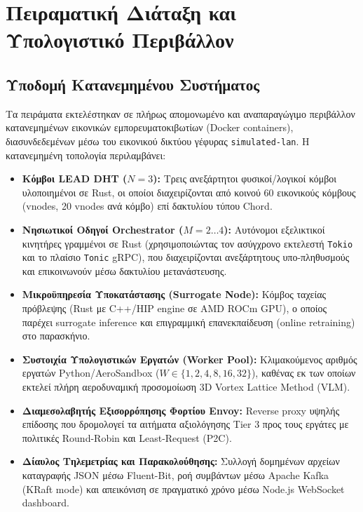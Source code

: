 \section{Πειραματική Διάταξη και Υπολογιστικό Περιβάλλον}
\label{sec:eval_setup}

\subsection{Υποδομή Κατανεμημένου Συστήματος}
Τα πειράματα εκτελέστηκαν σε πλήρως απομονωμένο και αναπαραγώγιμο περιβάλλον κατανεμημένων εικονικών εμπορευματοκιβωτίων (Docker containers), διασυνδεδεμένων μέσω του εικονικού δικτύου γέφυρας \texttt{simulated-lan}. Η κατανεμημένη τοπολογία περιλαμβάνει:
\begin{itemize}
    \item \textbf{Κόμβοι LEAD DHT ($N=3$):} Τρεις ανεξάρτητοι φυσικοί/λογικοί κόμβοι υλοποιημένοι σε Rust, οι οποίοι διαχειρίζονται από κοινού 60 εικονικούς κόμβους (vnodes, 20 vnodes ανά κόμβο) επί δακτυλίου τύπου Chord.
    \item \textbf{Νησιωτικοί Οδηγοί Orchestrator ($M=2\dots 4$):} Αυτόνομοι εξελικτικοί κινητήρες γραμμένοι σε Rust (χρησιμοποιώντας τον ασύγχρονο εκτελεστή \texttt{Tokio} και το πλαίσιο \texttt{Tonic} gRPC), που διαχειρίζονται ανεξάρτητους υπο-πληθυσμούς και επικοινωνούν μέσω δακτυλίου μετανάστευσης.
    \item \textbf{Μικροϋπηρεσία Υποκατάστασης (Surrogate Node):} Κόμβος ταχείας πρόβλεψης (Rust με C++/HIP engine σε AMD ROCm GPU), ο οποίος παρέχει surrogate inference και επιγραμμική επανεκπαίδευση (online retraining) στο παρασκήνιο.
    \item \textbf{Συστοιχία Υπολογιστικών Εργατών (Worker Pool):} Κλιμακούμενος αριθμός εργατών Python/AeroSandbox ($W \in \{1, 2, 4, 8, 16, 32\}$), καθένας εκ των οποίων εκτελεί πλήρη αεροδυναμική προσομοίωση 3D Vortex Lattice Method (VLM).
    \item \textbf{Διαμεσολαβητής Εξισορρόπησης Φορτίου Envoy:} Reverse proxy υψηλής επίδοσης που δρομολογεί τα αιτήματα αξιολόγησης Tier 3 προς τους εργάτες με πολιτικές Round-Robin και Least-Request (P2C).
    \item \textbf{Δίαυλος Τηλεμετρίας και Παρακολούθησης:} Συλλογή δομημένων αρχείων καταγραφής JSON μέσω Fluent-Bit, ροή συμβάντων μέσω Apache Kafka (KRaft mode) και απεικόνιση σε πραγματικό χρόνο μέσω Node.js WebSocket dashboard.
\end{itemize}

